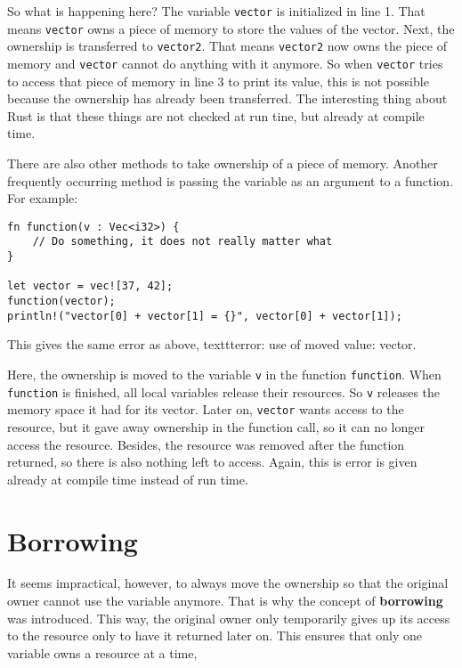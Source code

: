 So what is happening here? The variable \verb|vector| is initialized in line 1. That means \verb|vector| owns a piece of memory to store the values of the vector. Next, the ownership is transferred to \verb|vector2|. That means \verb|vector2| now owns the piece of memory and \verb|vector| cannot do anything with it anymore. So when \verb|vector| tries to access that piece of memory in line 3 to print its value, this is not possible because the ownership has already been transferred. The interesting thing about Rust is that these things are not checked at run tine, but already at compile time.

There are also other methods to take ownership of a piece of memory. Another frequently occurring method is passing the variable as an argument to a function. For example:

\begin{verbatim}
fn function(v : Vec<i32>) {
    // Do something, it does not really matter what
}

let vector = vec![37, 42];
function(vector);
println!("vector[0] + vector[1] = {}", vector[0] + vector[1]);
\end{verbatim}
This gives the same error as above, texttt{error: use of moved value: vector}. 

Here, the ownership is moved to the variable \verb|v| in the function \texttt{function}. When \verb|function| is finished, all local variables release their resources. So \verb|v| releases the memory space it had for its vector. Later on, \verb|vector| wants access to the resource, but it gave away ownership in the function call, so it can no longer access the resource. Besides, the resource was removed after the function returned, so there is also nothing left to access. Again, this is error is given already at compile time instead of run time. 

\section{Borrowing}
It seems impractical, however, to always move the ownership so that the original owner cannot use the variable anymore. That is why the concept of \textbf{borrowing} was introduced. This way, the original owner only temporarily gives up its access to the resource only to have it returned later on. This ensures that only one variable owns a resource at a time,  %

